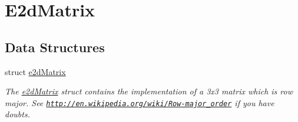 \hypertarget{group__e2dMatrix}{\section{E2d\-Matrix}
\label{group__e2dMatrix}
}
\subsection*{Data Structures}
\begin{DoxyCompactItemize}
\item 
struct \hyperlink{structe2dMatrix}{e2d\-Matrix}
\begin{DoxyCompactList}\small\item\em The \hyperlink{structe2dMatrix}{e2d\-Matrix} struct contains the implementation of a 3x3 matrix which is row major. See \href{http://en.wikipedia.org/wiki/Row-major_order}{\tt http\-://en.\-wikipedia.\-org/wiki/\-Row-\/major\-\_\-order} if you have doubts. \end{DoxyCompactList}\end{DoxyCompactItemize}
